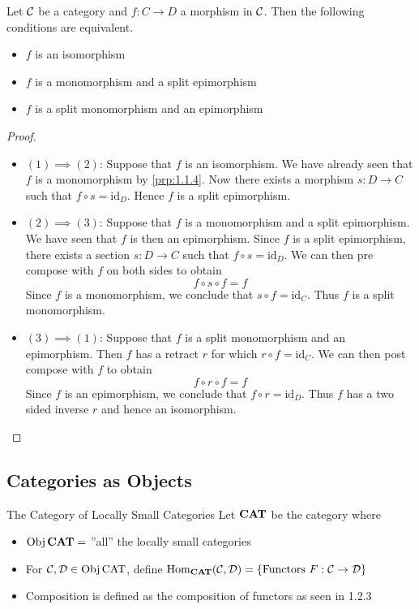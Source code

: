 \documentclass[a4paper]{article}
\begin{document}
\begin{prp}{}{} Let $\mathcal{C}$ be a category and $f:C\to D$ a morphism in $\mathcal{C}$. Then the following conditions are equivalent. 
\begin{itemize}
\item $f$ is an isomorphism
\item $f$ is a monomorphism and a split epimorphism
\item $f$ is a split monomorphism and an epimorphism
\end{itemize} \tcbline
\begin{proof}~\\
\begin{itemize}
\item $(1)\implies(2)$: Suppose that $f$ is an isomorphism. We have already seen that $f$ is a monomorphism by \ref{prp:1.1.4}. Now there exists a morphism $s:D\to C$ such that $f\circ s=\text{id}_D$. Hence $f$ is a split epimorphism. 

\item $(2)\implies(3)$: Suppose that $f$ is a monomorphism and a split epimorphism. We have seen that $f$ is then an epimorphism. Since $f$ is a split epimorphism, there exists a section $s:D\to C$ such that $f\circ s=\text{id}_D$. We can then pre compose with $f$ on both sides to obtain $$f\circ s\circ f=f$$ Since $f$ is a monomorphism, we conclude that $s\circ f=\text{id}_C$. Thus $f$ is a split monomorphism. 

\item $(3)\implies(1)$: Suppose that $f$ is a split monomorphism and an epimorphism. Then $f$ has a retract $r$ for which $r\circ f=\text{id}_C$. We can then post compose with $f$ to obtain $$f\circ r\circ f=f$$ Since $f$ is an epimorphism, we conclude that $f\circ r=\text{id}_D$. Thus $f$ has a two sided inverse $r$ and hence an isomorphism. 
\end{itemize}
\end{proof}
\end{prp}

\subsection{Categories as Objects}
\begin{defn}{The Category of Locally Small Categories}{} Let $\bold{CAT}$ be the category where 
\begin{itemize}
\item $\operatorname{Obj}\bold{CAT}=$ ''all'' the locally small categories
\item For $\mathcal{C},\mathcal{D}\in\operatorname{Obj}\text{CAT}$, define $\operatorname{Hom}_{\bold{CAT}}(\mathcal{C},\mathcal{D})=\{\text{Functors }F:\mathcal{C}\to\mathcal{D}\}$
\item Composition is defined as the composition of functors as seen in 1.2.3
\end{itemize}
\end{defn}
\end{document}
